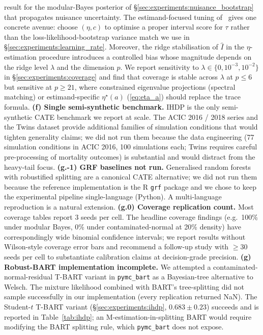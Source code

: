 result for the modular-Bayes posterior of \S\ref{sec:experiments:nuisance_bootstrap} that propagates nuisance
uncertainty. The estimand-focused tuning of~\citet{alexopoulos2025rbci} gives
one concrete avenue: choose $(\eta, c)$ to optimise a proper
interval score for $\tau$ rather than the loss-likelihood-bootstrap
variance match we use in \S\ref{sec:experiments:learning_rate}.
Moreover, the ridge stabilisation of $\widehat{I}$ in the
$\eta$-estimation procedure introduces a controlled bias whose
magnitude depends on the ridge level $\lambda$ and the dimension $p$.
We report sensitivity to $\lambda \in \{0, 10^{-3}, 10^{-2}\}$
in \S\ref{sec:experiments:coverage} and find that
coverage is stable across $\lambda$ at $p \le 6$ but sensitive
at $p \ge 21$, where constrained eigenvalue projections (spectral
matching) or estimand-specific $\eta^\star(a)$
(\eqref{eq:eta_a}) should replace the trace formula.
\textbf{(f) Single semi-synthetic benchmark.} IHDP is the only
semi-synthetic CATE benchmark we report at scale. The ACIC 2016 /
2018 series and the Twins dataset
provide additional families of simulation conditions
that would tighten generality claims; we did not run them because the
data engineering (77 simulation conditions in ACIC 2016, 100
simulations each; Twins requires careful pre-processing of
mortality outcomes) is substantial and would distract from the
heavy-tail focus.
\textbf{(g.-1) GRF baselines not run.} Generalised random forests
\citep{athey2019generalized} with robustified splitting are a
canonical CATE alternative; we did not run them because the
reference implementation is the R \texttt{grf} package and we
chose to keep the experimental pipeline single-language (Python).
A multi-language reproduction is a natural extension.
\textbf{(g.0) Coverage replication count.} Most coverage tables
report 3 seeds per cell. The headline coverage findings (e.g.\ 100\%
under modular Bayes, 0\% under contaminated-normal at 20\% density)
have correspondingly wide binomial confidence intervals; we report
results without Wilson-style coverage error bars and recommend a
follow-up study with $\geq 30$ seeds per cell to substantiate
calibration claims at decision-grade precision. \textbf{(g) Robust-BART implementation incomplete.} We attempted a
contaminated-normal-residual T-BART variant in
\texttt{pymc\_bart} as a Bayesian-tree alternative to Welsch.
The mixture likelihood combined with BART's tree-splitting did not
sample successfully in our implementation (every replication
returned NaN). The Student-$t$ T-BART variant
(\S\ref{sec:experiments:ihdp}, $0.683 \pm 0.23$) succeeds and
is reported in Table~\ref{tab:ihdp}; an M-estimation-in-splitting
BART would require modifying the BART splitting rule, which
\texttt{pymc\_bart} does not expose.

